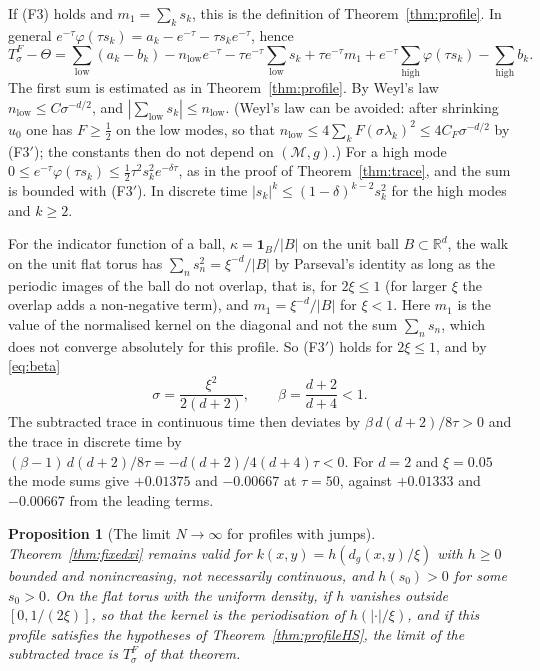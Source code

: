 \documentclass[11pt,a4paper]{article}
\makeatletter
\theoremstyle{stmt}
\newtheorem{proposition}[theorem]{Proposition}
\theoremstyle{defn}
\theoremstyle{rmk}
\renewenvironment{proof}[1][\proofname]{\par\pushQED{\qed}\normalfont\topsep6\p@\@plus6\p@\relax
  \trivlist\item[\hskip\labelsep{\sffamily\itshape\small #1.}]\ignorespaces}{\popQED\endtrivlist\@endpefalse}
\numberwithin{equation}{section}
\newcommand{\M}{\mathcal{M}}
\newcommand{\R}{\mathbb{R}}
\makeatother
\begin{document}
{\begin{proof}
If \textup{(F3)} holds and $m_1=\sum_ks_k$, this is the definition of Theorem~\ref{thm:profile}. In general $e^{-\tau}\varphi(\tau s_k)=a_k-e^{-\tau}-\tau s_ke^{-\tau}$, hence
\[
T^F_\sigma-\Theta=\sum_{\mathrm{low}}(a_k-b_k)-n_{\mathrm{low}}e^{-\tau}-\tau e^{-\tau}\sum_{\mathrm{low}}s_k+\tau e^{-\tau}m_1+e^{-\tau}\sum_{\mathrm{high}}\varphi(\tau s_k)-\sum_{\mathrm{high}}b_k .
\]
The first sum is estimated as in Theorem~\ref{thm:profile}. By Weyl's law $n_{\mathrm{low}}\le C\sigma^{-d/2}$, and $|\sum_{\mathrm{low}}s_k|\le n_{\mathrm{low}}$. (Weyl's law can be avoided: after shrinking $u_0$ one has $F\ge\frac12$ on the low modes, so that $n_{\mathrm{low}}\le4\sum_kF(\sigma\lambda_k)^2\le4C_F\sigma^{-d/2}$ by \textup{(F3$'$)}; the constants then do not depend on $(\M,g)$.) For a high mode $0\le e^{-\tau}\varphi(\tau s_k)\le\tfrac12\tau^2s_k^2e^{-\delta\tau}$, as in the proof of Theorem~\ref{thm:trace}, and the sum is bounded with \textup{(F3$'$)}. In discrete time $|s_k|^k\le(1-\delta)^{k-2}s_k^2$ for the high modes and $k\ge2$.
\end{proof}

For the indicator function of a ball, $\kappa=\mathbf 1_B/|B|$ on the unit ball $B\subset\R^d$, the walk on the unit flat torus has $\sum_ns_n^2=\xi^{-d}/|B|$ by Parseval's identity as long as the periodic images of the ball do not overlap, that is, for $2\xi\le1$ (for larger $\xi$ the overlap adds a non-negative term), and $m_1=\xi^{-d}/|B|$ for $\xi<1$. Here $m_1$ is the value of the normalised kernel on the diagonal and not the sum $\sum_ns_n$, which does not converge absolutely for this profile. So \textup{(F3$'$)} holds for $2\xi\le1$, and by \eqref{eq:beta}
\[
\sigma=\frac{\xi^2}{2(d+2)},\qquad\beta=\frac{d+2}{d+4}<1 .
\]
The subtracted trace in continuous time then deviates by $\beta\,d(d+2)/8\tau>0$ and the trace in discrete time by $(\beta-1)\,d(d+2)/8\tau=-d(d+2)/4(d+4)\tau<0$. For $d=2$ and $\xi=0.05$ the mode sums give $+0.01375$ and $-0.00667$ at $\tau=50$, against $+0.01333$ and $-0.00667$ from the leading terms.

\begin{proposition}[The limit $N\to\infty$ for profiles with jumps]\label{prop:fixedxijump}
Theorem~\ref{thm:fixedxi} remains valid for $k(x,y)=h(d_g(x,y)/\xi)$ with $h\ge0$ bounded and nonincreasing, not necessarily continuous, and $h(s_0)>0$ for some $s_0>0$. On the flat torus with the uniform density, if $h$ vanishes outside $[0,1/(2\xi)]$, so that the kernel is the periodisation of $h(|\cdot|/\xi)$, and if this profile satisfies the hypotheses of Theorem~\ref{thm:profileHS}, the limit of the subtracted trace is $T^F_\sigma$ of that theorem.
\end{proposition}

}
\end{document}
